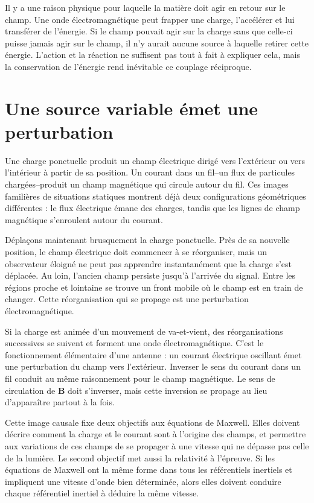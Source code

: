 Il y a une raison physique pour laquelle la matière doit agir en retour sur le champ. Une onde électromagnétique peut frapper une charge, l’accélérer et lui transférer de l’énergie. Si le champ pouvait agir sur la charge sans que celle-ci puisse jamais agir sur le champ, il n’y aurait aucune source à laquelle retirer cette énergie. L’action et la réaction ne suffisent pas tout à fait à expliquer cela, mais la conservation de l’énergie rend inévitable ce couplage réciproque.

\section{Une source variable émet une perturbation}

Une charge ponctuelle produit un champ électrique dirigé vers l’extérieur ou vers l’intérieur à partir de sa position. Un courant dans un fil--un flux de particules chargées--produit un champ magnétique qui circule autour du fil. Ces images familières de situations statiques montrent déjà deux configurations géométriques différentes : le flux électrique émane des charges, tandis que les lignes de champ magnétique s’enroulent autour du courant.

Déplaçons maintenant brusquement la charge ponctuelle. Près de sa nouvelle position, le champ électrique doit commencer à se réorganiser, mais un observateur éloigné ne peut pas apprendre instantanément que la charge s’est déplacée. Au loin, l’ancien champ persiste jusqu’à l’arrivée du signal. Entre les régions proche et lointaine se trouve un front mobile où le champ est en train de changer. Cette réorganisation qui se propage est une perturbation électromagnétique.

Si la charge est animée d’un mouvement de va-et-vient, des réorganisations successives se suivent et forment une onde électromagnétique. C’est le fonctionnement élémentaire d’une antenne : un courant électrique oscillant émet une perturbation du champ vers l’extérieur. Inverser le sens du courant dans un fil conduit au même raisonnement pour le champ magnétique. Le sens de circulation de \(\mathbf B\) doit s’inverser, mais cette inversion se propage au lieu d’apparaître partout à la fois.

Cette image causale fixe deux objectifs aux équations de Maxwell. Elles doivent décrire comment la charge et le courant sont à l’origine des champs, et permettre aux variations de ces champs de se propager à une vitesse qui ne dépasse pas celle de la lumière. Le second objectif met aussi la relativité à l’épreuve. Si les équations de Maxwell ont la même forme dans tous les référentiels inertiels et impliquent une vitesse d’onde bien déterminée, alors elles doivent conduire chaque référentiel inertiel à déduire la même vitesse.


